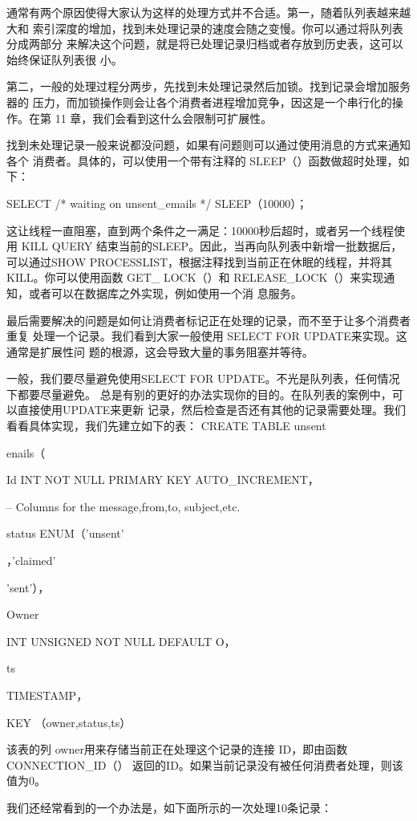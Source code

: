 通常有两个原因使得大家认为这样的处理方式并不合适。第一，随着队列表越来越大和
索引深度的增加，找到未处理记录的速度会随之变慢。你可以通过将队列表分成两部分
来解决这个问题，就是将已处理记录归档或者存放到历史表，这可以始终保证队列表很
小。

第二，一般的处理过程分两步，先找到未处理记录然后加锁。找到记录会增加服务器的
压力，而加锁操作则会让各个消费者进程增加竞争，因这是一个串行化的操作。在第
11 章，我们会看到这什么会限制可扩展性。

找到未处理记录一般来说都没问题，如果有问题则可以通过使用消息的方式来通知各个
消费者。具体的，可以使用一个带有注释的 SLEEP（）函数做超时处理，如下：

SELECT /* waiting on unsent\_emails */ SLEEP（10000）；

这让线程一直阻塞，直到两个条件之一满足：10000秒后超时，或者另一个线程使用
KILL QUERY 结束当前的SLEEP。因此，当再向队列表中新增一批数据后，可以通过SHOW
PROCESSLIST，根据注释找到当前正在休眠的线程，并将其 KILL。你可以使用函数 GET\_
LOCK（）和 RELEASE\_LOCK（）来实现通知，或者可以在数据库之外实现，例如使用一个消
息服务。

最后需要解决的问题是如何让消费者标记正在处理的记录，而不至于让多个消费者重复
处理一个记录。我们看到大家一般使用 SELECT FOR UPDATE来实现。这通常是扩展性问
题的根源，这会导致大量的事务阻塞并等待。

一般，我们要尽量避免使用SELECT FOR UPDATE。不光是队列表，任何情况下都要尽量避免。
总是有别的更好的办法实现你的目的。在队列表的案例中，可以直接使用UPDATE来更新
记录，然后检查是否还有其他的记录需要处理。我们看看具体实现，我们先建立如下的表：
CREATE TABLE unsent

enails（

Id INT NOT NULL PRIMARY KEY AUTO\_INCREMENT，

-- Columns for the message,from,to, subject,etc.

status ENUM（'unsent'

，'claimed'

'sent'），

Owner

INT UNSIGNED NOT NULL DEFAULT O，

ts

TIMESTAMP，

KEY （owner,status,ts）

该表的列 owner用来存储当前正在处理这个记录的连接 ID，即由函数 CONNECTION\_ID（）
返回的ID。如果当前记录没有被任何消费者处理，则该值为0。

我们还经常看到的一个办法是，如下面所示的一次处理10条记录：

